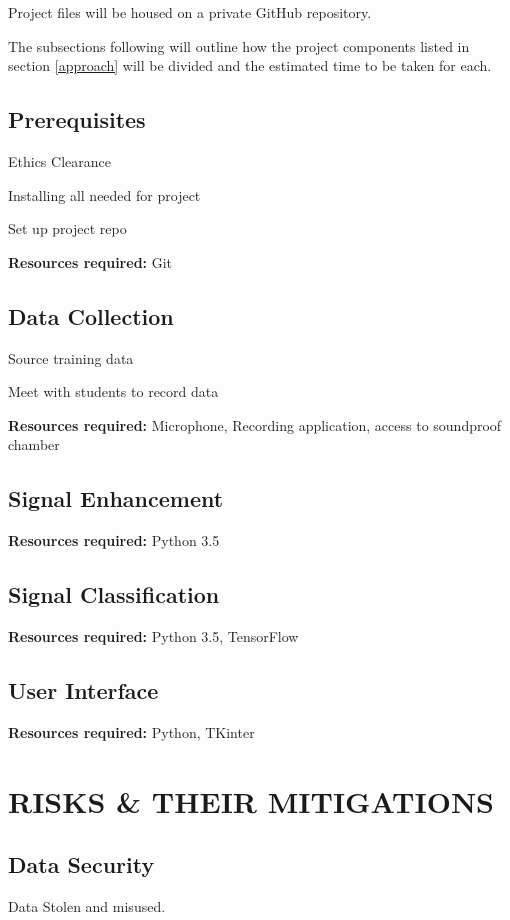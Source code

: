 \documentclass[10pt,twocolumn]{witseiepaper}
\begin{document}
Project files will be housed on a private GitHub repository.

The subsections following will outline how the project components listed in section \ref{approach} will be divided and the estimated time to be taken for each.

\subsection{Prerequisites}
Ethics Clearance

Installing all needed for project

Set up project repo

\textbf{Resources required:} Git

\subsection{Data Collection}

Source training data

Meet with students to record data

\textbf{Resources required:} Microphone, Recording application, access to soundproof chamber


\subsection{Signal Enhancement}

\textbf{Resources required:} Python 3.5


\subsection{Signal Classification}

\textbf{Resources required:} Python 3.5, TensorFlow


\subsection{User Interface}

\textbf{Resources required:} Python, TKinter


\section{RISKS \& THEIR MITIGATIONS} %
\subsection{Data Security}
Data Stolen and misused.
\end{document}
